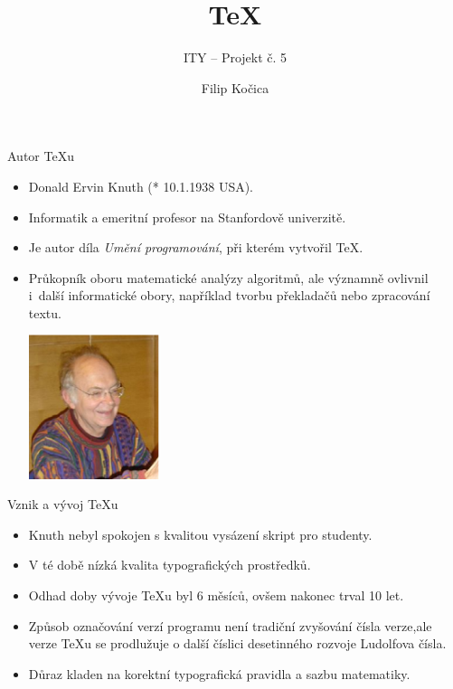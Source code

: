 \documentclass[fyma2,pdf,final]{prosper}
\begin{document}
\title{\TeX}
\subtitle{ITY -- Projekt č. 5}
\author{Filip Kočica}
\maketitle

\begin{slide}{Autor \TeX u}
\begin{itemize}
    \item Donald Ervin Knuth (* 10.1.1938 USA). \bigskip
    \item Informatik a emeritní profesor na Stanfordově univerzitě. \bigskip
    \item Je autor díla \emph{Umění programování}, při kterém vytvořil \TeX. \bigskip
    \item Průkopník oboru matematické analýzy algoritmů, ale významně ovlivnil
          i~další informatické obory, například tvorbu překladačů nebo zpracování textu.
    \begin{center}
      \includegraphics[width=0.3\textwidth]{donald_e_knuth.eps}
    \end{center} \bigskip
\end{itemize}
\end{slide}

\begin{slide}{Vznik a vývoj \TeX u}
\begin{itemize}
    \item Knuth nebyl spokojen s kvalitou vysázení skript pro studenty. \bigskip
    \item V té době nízká kvalita typografických prostředků. \bigskip
    \item Odhad doby vývoje \TeX u byl 6 měsíců, ovšem nakonec trval 10 let. \bigskip
    \item Způsob označování verzí programu není tradiční zvyšování čísla verze,ale verze
          TeXu se prodlužuje o další číslici desetinného rozvoje Ludolfova čísla. \bigskip
    \item Důraz kladen na korektní typografická pravidla a sazbu matematiky.
\end{itemize}
\end{slide}
\end{document}

